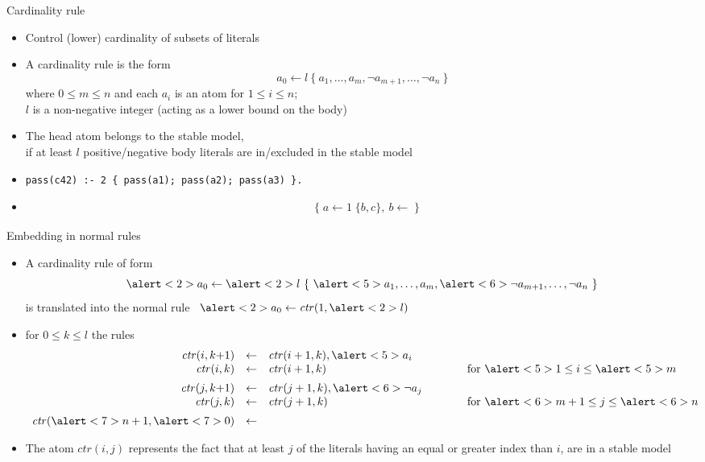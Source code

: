 \begin{frame}[fragile]{Cardinality rule}
  \label{eqn:cardinality:rule}
  \begin{itemize}
  \item {}
    Control (lower) cardinality of subsets of literals
  \item {}
    A \alert{cardinality rule} is the form
    \[
    a_0\leftarrow l~\{\ a_1,\dots,a_m,\neg a_{m+1},\dots,\neg a_n\ \}
    \]
    where $0\leq m\leq n$ and each $a_i$ is an atom for $1\leq i\leq n$;\\
    $l$ is a non-negative integer (acting as a \alert{lower bound} on the body)
    \smallskip
  \item<2-> 
    The head atom belongs to the stable model,\\
    if at least $l$ positive/negative body literals are in/excluded in the stable model
    \medskip
  \item<3-> 
\begin{lstlisting}[basicstyle=\ttfamily\small]
pass(c42) :- 2 { pass(a1); pass(a2); pass(a3) }.
\end{lstlisting}
  \item<4-> 
    \begin{align*}
      & \{\;a\leftarrow 1\;\{b,c\},\ b\leftarrow\;\}
    \end{align*}
  \end{itemize}
\end{frame}
\begin{frame}{Embedding in normal rules}
\begin{itemize}
\item A cardinality rule of form
\[
\alert<2>{a_0}\leftarrow\alert<2>{l}~\{\ \alert<5>{a_1,\dots,a_m},\alert<6>{\neg a_{m+1},\dots,\neg a_n}\ \}
\]
is translated into the normal rule \
\(
\alert<2>{a_0}\leftarrow \mathit{ctr}(1,\alert<2>{l})
\)
\ \uncover<4->{and}
\item<only@4-> [] for $0\leq k\leq l$ the rules
\[
\begin{array}{rclp{20pt}l}
\mathit{ctr}(i, k{+}1)&\leftarrow&\mathit{ctr}({i+1}, k),\alert<5>{a_i}
&&\\
\mathit{ctr}(i, k)&\leftarrow&\mathit{ctr}({i+1}, k)
&&\text{for }\alert<5>{1}\leq i\leq \alert<5>{m}
\\[5pt]
\mathit{ctr}(j, k{+}1)&\leftarrow&\mathit{ctr}({j+1}, k),\alert<6>{\neg a_j}
\\
\mathit{ctr}(j, k)&\leftarrow&\mathit{ctr}({j+1}, k)
&&\text{for }\alert<6>{m+1}\leq j\leq \alert<6>{n}
\\[5pt]
\mathit{ctr}(\alert<7>{n+1}, \alert<7>{0})&\leftarrow&
&&
\end{array}
\]
\item<3->
The atom $\mathit{ctr}(i,j)$ represents the fact that at least $j$ of the
literals having an equal or greater index than $i$, are in a stable model
\end{itemize}
\end{frame}

